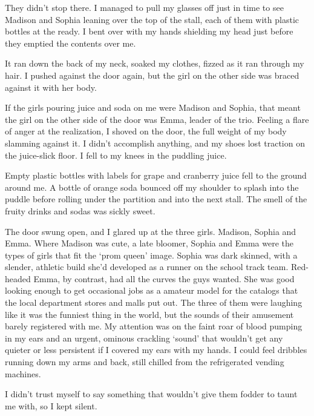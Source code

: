 They didn't stop there.  I managed to pull my glasses off just in time to see Madison and Sophia leaning over the top of the stall, each of them with plastic bottles at the ready.  I bent over with my hands shielding my head just before they emptied the contents over me.



It ran down the back of my neck, soaked my clothes, fizzed as it ran through my hair.  I pushed against the door again, but the girl on the other side was braced against it with her body.



If the girls pouring juice and soda on me were Madison and Sophia, that meant the girl on the other side of the door was Emma, leader of the trio.  Feeling a flare of anger at the realization, I shoved on the door, the full weight of my body slamming against it.  I didn't accomplish anything, and my shoes lost traction on the juice-slick floor.  I fell to my knees in the puddling juice.



Empty plastic bottles with labels for grape and cranberry juice fell to the ground around me.  A bottle of orange soda bounced off my shoulder to splash into the puddle before rolling under the partition and into the next stall.  The smell of the fruity drinks and sodas was sickly sweet.



The door swung open, and I glared up at the three girls.  Madison, Sophia and Emma.  Where Madison was cute, a late bloomer, Sophia and Emma were the types of girls that fit the `prom queen' image.  Sophia was dark skinned, with a slender, athletic build she'd developed as a runner on the school track team.  Red-headed Emma, by contrast, had all the curves the guys wanted.  She was good looking enough to get occasional jobs as a amateur model for the catalogs that the local department stores and malls put out.  The three of them were laughing like it was the funniest thing in the world, but the sounds of their amusement barely registered with me.  My attention was on the faint roar of blood pumping in my ears and an urgent, ominous crackling `sound' that wouldn't get any quieter or less persistent if I covered my ears with my hands.  I could feel dribbles running down my arms and back, still chilled from the refrigerated vending machines.



I didn't trust myself to say something that wouldn't give them fodder to taunt me with, so I kept silent.



